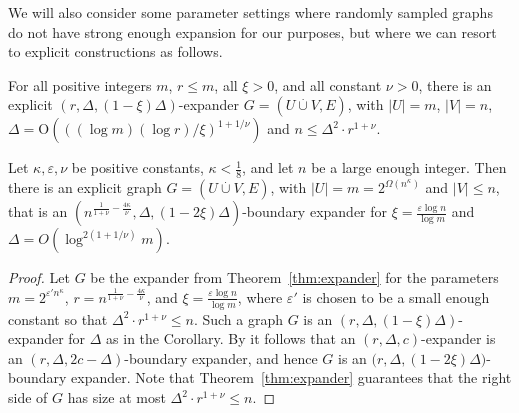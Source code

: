 \documentclass{theoretics}
\newcommand{\BIGOH}[1]{\mathrm{O} \left( #1 \right)}
\newcommand{\bigomega}[1]{\Omega ( #1 )}
\newcommand{\setsize}[1]{\lvert#1\rvert}
\newcommand{\disjointunion}{\overset{.}{\cup}}
\newcommand{\numpigeons}{m}
\newcommand{\numholes}{n}
\newcommand{\diff}{\xi}
\newcommand{\GdegMax}{\Delta}
\newcommand{\gdegmax}{\GdegMax}
\numberwithin{equation}{section}
\begin{document}
We will also consider some parameter settings where randomly
sampled graphs do not have strong enough expansion for our purposes, 
but where we can resort to explicit constructions as follows.

\begin{theorem}\label{thm:expander}
  For all positive integers $\numpigeons$, $r \le \numpigeons$, all $\diff > 0$,
  and all constant $\nu > 0$, there is an explicit 
  $( r, \gdegmax, (1- \diff)\GdegMax)$-expander
  $G=(U\disjointunion V, E)$,
  with $\setsize{U} = \numpigeons$,
  $\setsize{V} = \numholes$, 
  $\GdegMax = \BIGOH{ ((\log \numpigeons)(\log r) / \diff )^{1+1/\nu} }$
  and $\numholes \le \GdegMax^2 \cdot r^{1+\nu}$.
\end{theorem}


\begin{corollary}\label{cor:boundary_subexp}
  Let $\kappa, \varepsilon, \nu$ be positive constants,
  $\kappa <\frac{1}{8}$, and let $\numholes$ be a large enough
  integer.  Then there is an explicit graph
  $G=(U \disjointunion V, E)$, with
  $\setsize{U} = \numpigeons = 2^{\bigomega{\numholes^\kappa}}$ and
  $\setsize{V} \leq \numholes$, that is an
  $(\numholes^{\frac{1}{1 + \nu} - \frac{4\kappa}{\nu} }, \GdegMax, (1
  - 2\diff)\GdegMax)$-boundary expander for
  $\diff = \frac{ \varepsilon \log \numholes }{ \log \numpigeons }$
  and $\GdegMax = O(\log^{2 (1 + 1/\nu) }\numpigeons)$.
\end{corollary}

  \begin{proof}
    Let $G$ be the expander from Theorem~\ref{thm:expander} for the
    parameters
    $\numpigeons = 2^{\varepsilon' \numholes^\kappa}$, 
    $r = \numholes^{\frac{1}{1 + \nu} - \frac{4\kappa}{\nu} }$, and
    $\diff = \frac{ \varepsilon \log \numholes }{ \log \numpigeons }$,
    where $\varepsilon'$ is chosen to be a small enough constant so that 
    $\GdegMax^2 \cdot r^{1+\nu} \leq  \numholes$.
    Such a graph $G$ is an $(r, \gdegmax, (1-\diff)\GdegMax)$-expander
    for $\GdegMax$ as in the
    Corollary. By  it follows that an 
    $(r, \gdegmax, c)$-expander is an
    $(r, \gdegmax, 2c - \gdegmax)$-boundary expander, 
    and hence $G$ is an 
    $\bigl(r, \GdegMax, (1 -  2\diff)\GdegMax\bigr)$-boundary expander. Note
    that Theorem~\ref{thm:expander} guarantees that the right side of $G$ has size at most 
    $\GdegMax^2 \cdot r^{1+\nu} \leq \numholes$. 
  \end{proof}
\end{document}
